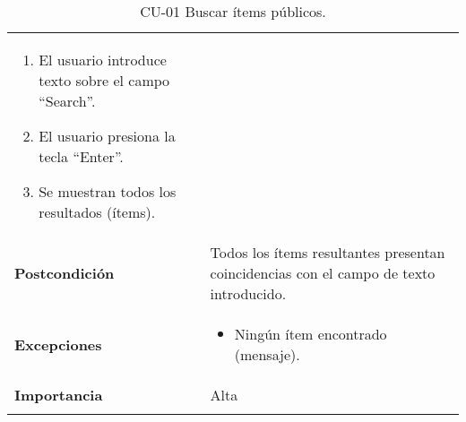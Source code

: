 \begin{longtable}[]{@{}ll@{}}
\begin{minipage}[t]{0.73\columnwidth}
\begin{enumerate}
\def\labelenumi{\arabic{enumi}.}
\tightlist
\item
  El usuario introduce texto sobre el campo ``Search''.
\item
  El usuario presiona la tecla ``Enter''.
\item
  Se muestran todos los resultados (ítems).
\end{enumerate}\strut
\end{minipage}\tabularnewline
\begin{minipage}[t]{0.21\columnwidth}\raggedright
\textbf{Postcondición}\strut
\end{minipage} & \begin{minipage}[t]{0.73\columnwidth}\raggedright
Todos los ítems resultantes presentan coincidencias con el campo de
texto introducido.\strut
\end{minipage}\tabularnewline
\begin{minipage}[t]{0.21\columnwidth}\raggedright
\textbf{Excepciones}\strut
\end{minipage} & \begin{minipage}[t]{0.73\columnwidth}\raggedright
\begin{itemize}
\tightlist
\item
  Ningún ítem encontrado (mensaje).
\end{itemize}\strut
\end{minipage}\tabularnewline
\begin{minipage}[t]{0.21\columnwidth}\raggedright
\textbf{Importancia}\strut
\end{minipage} & \begin{minipage}[t]{0.73\columnwidth}\raggedright
Alta\strut
\end{minipage}\tabularnewline
\bottomrule
\caption{CU-01 Buscar ítems públicos.}
\end{longtable}

